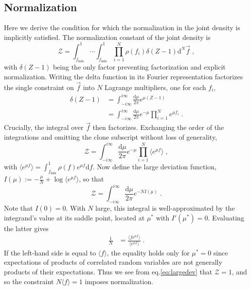 \documentclass[letterpaper,english,prl,reprint,longbibliography]{revtex4-1}
\begin{document}
\subsection*{Normalization}
Here we derive the condition for which the normalization in the joint density is implicitly satisfied. The normalization constant of the joint density is
\begin{equation}
	\mathcal{Z}=\int_{f_\textrm{min}}^1\cdots\int_{f_\textrm{min}}^1\prod_{i=1}^N \rho(f_i)\delta(Z-1)\textrm{d}^N\vec{f} \;,
\end{equation}
with $\delta(Z-1)$ being the only factor preventing factorization and explicit normalization. Writing the delta function in its Fourier representation factorizes the single constraint on $\vec{f}$ into $N$ Lagrange multipliers, one for each $f_i$,
\begin{align}
	\delta(Z-1)&=\int_{-i\infty}^{i\infty} \frac{\textrm{d} \mu}{2 \pi}e^{\mu(Z-1)}  \\
	&=\int_{-i\infty}^{i\infty} \frac{\textrm{d} \mu}{2 \pi}e^{-\mu}\prod_{i=1}^N e^{\mu f_i} \;.
\end{align}
Crucially, the integral over $\vec{f}$ then factorizes. Exchanging the order of the integrations and omitting the clone subscript without loss of generality,
\begin{equation}
	\mathcal{Z}=\int_{-i\infty}^{i\infty} \frac{\textrm{d} \mu}{2 \pi} e^{-\mu} \prod_{i=1}^N \langle e^{\mu f}\rangle\;,\label{eq:bigZ}
\end{equation}
with $\langle e^{\mu f}\rangle=\int_{f_\textrm{min}}^1\rho(f)e^{\mu f}\textrm{d}f$. Now define the large deviation function, $I(\mu):=-\frac{\mu}{N}+\log \langle e^{\mu f}\rangle$, so that 
\begin{equation}
	\mathcal{Z}=\int_{-i\infty}^{i\infty} \frac{\textrm{d} \mu}{2 \pi} e^{-N I(\mu)}\;.\label{eq:largedev}
\end{equation}
Note that $I(0)=0$. With $N$ large, this integral is well-approximated by the integrand's value at its saddle point, located at $\mu^*$ with $I'(\mu^*)=0$.  Evaluating the latter gives
\begin{align}
	\frac{1}{N}&=\frac{\langle f e^{\mu f}\rangle}{\langle e^{\mu f}\rangle}\;.
\end{align} 
If the left-hand side is equal to $\langle f\rangle$, the equality holds only for $\mu^*=0$ since expectations of products of correlated random variables are not generally products of their expectations. Thus we see from eq.\ref{eq:largedev} that $\mathcal{Z}=1$, and so the constraint $N\langle f\rangle=1$ imposes normalization.
\end{document}
